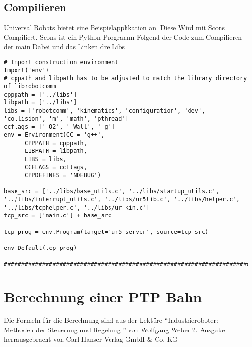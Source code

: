 \documentclass[
a4paper,
12pt,
oneside,
headsepline,		%
footsepline,		%
]{scrbook}
\begin{document}
\section{Compilieren}

Universal Robots bietet eine Beispielapplikation an. Diese Wird mit Scons Compiliert. Scons ist ein Python Programm
Folgend der Code zum Compilieren der main Dabei und das Linken dre Libs

\begin{lstlisting}
# Import construction environment
Import('env')
# cppath and libpath has to be adjusted to match the library directory of librobotcomm
cpppath = ['../libs']
libpath = ['../libs']
libs = ['robotcomm', 'kinematics', 'configuration', 'dev', 'collision', 'm', 'math', 'pthread']
ccflags = ['-O2', '-Wall', '-g']
env = Environment(CC = 'g++',
      CPPPATH = cpppath,
      LIBPATH = libpath,
      LIBS = libs,
      CCFLAGS = ccflags,
      CPPDEFINES = 'NDEBUG')

base_src = ['../libs/base_utils.c', '../libs/startup_utils.c', '../libs/interrupt_utils.c', '../libs/ur5lib.c', '../libs/helper.c', '../libs/tcphelper.c', '../libs/ur_kin.c']
tcp_src = ['main.c'] + base_src

tcp_prog = env.Program(target='ur5-server', source=tcp_src)

env.Default(tcp_prog)

###############################################################################
\end{lstlisting}

\chapter{Berechnung einer PTP Bahn}

Die Formeln für die Berechnung sind aus der Lektüre ``Industrieroboter: Methoden der Steuerung und Regelung '' von Wolfgang Weber 2. Ausgabe
herrausgebracht von  Carl Hanser Verlag GmbH & Co. KG
\end{document}

